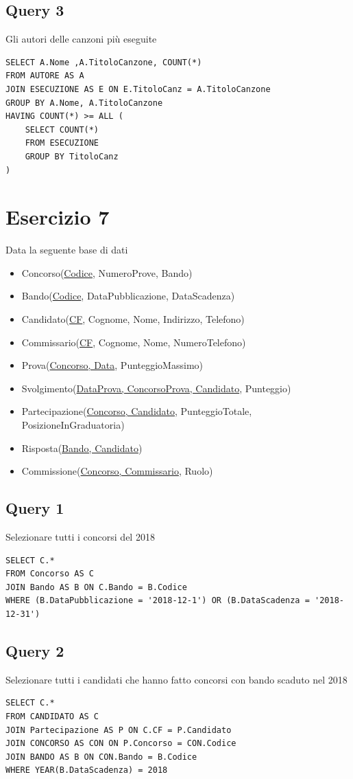 \subsection{Query 3}
Gli autori delle canzoni più eseguite
\begin{lstlisting}
SELECT A.Nome ,A.TitoloCanzone, COUNT(*)
FROM AUTORE AS A 
JOIN ESECUZIONE AS E ON E.TitoloCanz = A.TitoloCanzone
GROUP BY A.Nome, A.TitoloCanzone
HAVING COUNT(*) >= ALL (
    SELECT COUNT(*)
    FROM ESECUZIONE
    GROUP BY TitoloCanz
)
\end{lstlisting}

\newpage
\section{Esercizio 7}
\noindent
Data la seguente base di dati

\begin{itemize}
    \item Concorso(\underline{Codice}, NumeroProve, Bando)
    \item Bando(\underline{Codice}, DataPubblicazione, DataScadenza)
    \item Candidato(\underline{CF}, Cognome, Nome, Indirizzo, Telefono)
    \item Commissario(\underline{CF}, Cognome, Nome, NumeroTelefono)
    \item Prova(\underline{Concorso, Data}, PunteggioMassimo)
    \item Svolgimento(\underline{DataProva, ConcorsoProva, Candidato}, Punteggio)
    \item Partecipazione(\underline{Concorso, Candidato}, PunteggioTotale, PosizioneInGraduatoria)
    \item Risposta(\underline{Bando, Candidato})
    \item Commissione(\underline{Concorso, Commissario}, Ruolo)
\end{itemize}

\subsection{Query 1}
Selezionare tutti i concorsi del 2018
\begin{lstlisting}
SELECT C.*
FROM Concorso AS C
JOIN Bando AS B ON C.Bando = B.Codice
WHERE (B.DataPubblicazione = '2018-12-1') OR (B.DataScadenza = '2018-12-31')
\end{lstlisting}

\subsection{Query 2}
Selezionare tutti i candidati che hanno fatto concorsi con bando scaduto nel 2018
\begin{lstlisting}
SELECT C.*
FROM CANDIDATO AS C
JOIN Partecipazione AS P ON C.CF = P.Candidato
JOIN CONCORSO AS CON ON P.Concorso = CON.Codice
JOIN BANDO AS B ON CON.Bando = B.Codice
WHERE YEAR(B.DataScadenza) = 2018
\end{lstlisting}

